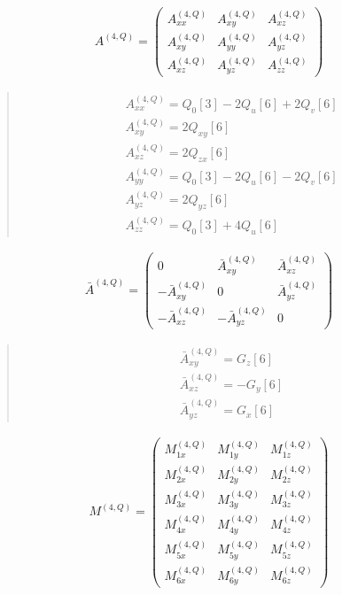 \documentclass[fleqn,10pt]{jsarticle}
\begin{document}
\begin{align*}
A^{(4,Q)} = \begin{pmatrix} A^{(4,Q)}_{xx} & A^{(4,Q)}_{xy} & A^{(4,Q)}_{xz} \\ A^{(4,Q)}_{xy} & A^{(4,Q)}_{yy} & A^{(4,Q)}_{yz} \\ A^{(4,Q)}_{xz} & A^{(4,Q)}_{yz} & A^{(4,Q)}_{zz} \end{pmatrix}
\end{align*}
\begin{quote}
\begin{align*}
& A^{(4,Q)}_{xx} = Q_{0}[3] - 2 Q_{u}[6] + 2 Q_{v}[6] \\
& A^{(4,Q)}_{xy} = 2 Q_{xy}[6] \\
& A^{(4,Q)}_{xz} = 2 Q_{zx}[6] \\
& A^{(4,Q)}_{yy} = Q_{0}[3] - 2 Q_{u}[6] - 2 Q_{v}[6] \\
& A^{(4,Q)}_{yz} = 2 Q_{yz}[6] \\
& A^{(4,Q)}_{zz} = Q_{0}[3] + 4 Q_{u}[6]
\end{align*}
\end{quote}
\begin{align*}
\bar{A}^{(4,Q)} = \begin{pmatrix} 0 & \bar{A}^{(4,Q)}_{xy} & \bar{A}^{(4,Q)}_{xz} \\ - \bar{A}^{(4,Q)}_{xy} & 0 & \bar{A}^{(4,Q)}_{yz} \\ - \bar{A}^{(4,Q)}_{xz} & - \bar{A}^{(4,Q)}_{yz} & 0 \end{pmatrix}
\end{align*}
\begin{quote}
\begin{align*}
& \bar{A}^{(4,Q)}_{xy} = G_{z}[6] \\
& \bar{A}^{(4,Q)}_{xz} = - G_{y}[6] \\
& \bar{A}^{(4,Q)}_{yz} = G_{x}[6]
\end{align*}
\end{quote}
\begin{align*}
M^{(4,Q)} = \begin{pmatrix} M^{(4,Q)}_{1x} & M^{(4,Q)}_{1y} & M^{(4,Q)}_{1z} \\ M^{(4,Q)}_{2x} & M^{(4,Q)}_{2y} & M^{(4,Q)}_{2z} \\ M^{(4,Q)}_{3x} & M^{(4,Q)}_{3y} & M^{(4,Q)}_{3z} \\ M^{(4,Q)}_{4x} & M^{(4,Q)}_{4y} & M^{(4,Q)}_{4z} \\ M^{(4,Q)}_{5x} & M^{(4,Q)}_{5y} & M^{(4,Q)}_{5z} \\ M^{(4,Q)}_{6x} & M^{(4,Q)}_{6y} & M^{(4,Q)}_{6z} \end{pmatrix}
\end{align*}
\end{document}
